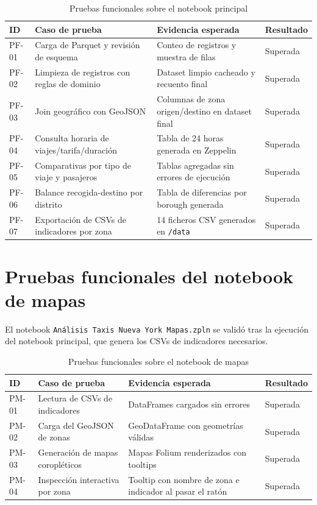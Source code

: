 \begin{table}[H]
	\centering
	\caption{Pruebas funcionales sobre el notebook principal}
	\begin{tabular}{|p{1.7cm}|p{6.1cm}|p{4.1cm}|p{2.4cm}|}
		\hline
		\textbf{ID} & \textbf{Caso de prueba} & \textbf{Evidencia esperada} & \textbf{Resultado} \\
		\hline
		PF-01 & Carga de Parquet y revisión de esquema & Conteo de registros y muestra de filas & Superada \\
		\hline
		PF-02 & Limpieza de registros con reglas de dominio & Dataset limpio cacheado y recuento final & Superada \\
		\hline
		PF-03 & Join geográfico con GeoJSON & Columnas de zona origen/destino en dataset final & Superada \\
		\hline
		PF-04 & Consulta horaria de viajes/tarifa/duración & Tabla de 24 horas generada en Zeppelin & Superada \\
		\hline
		PF-05 & Comparativas por tipo de viaje y pasajeros & Tablas agregadas sin errores de ejecución & Superada \\
		\hline
		PF-06 & Balance recogida-destino por distrito & Tabla de diferencias por borough generada & Superada \\
		\hline
		PF-07 & Exportación de CSVs de indicadores por zona & 14 ficheros CSV generados en \texttt{/data} & Superada \\
		\hline
	\end{tabular}
\end{table}

\section{Pruebas funcionales del notebook de mapas}
El notebook \texttt{Análisis Taxis Nueva York Mapas.zpln} se validó tras la
ejecución del notebook principal, que genera los CSVs de indicadores necesarios.

\begin{table}[H]
	\centering
	\caption{Pruebas funcionales sobre el notebook de mapas}
	\begin{tabular}{|p{1.7cm}|p{6.1cm}|p{4.1cm}|p{2.4cm}|}
		\hline
		\textbf{ID} & \textbf{Caso de prueba} & \textbf{Evidencia esperada} & \textbf{Resultado} \\
		\hline
		PM-01 & Lectura de CSVs de indicadores & DataFrames cargados sin errores & Superada \\
		\hline
		PM-02 & Carga del GeoJSON de zonas & GeoDataFrame con geometrías válidas & Superada \\
		\hline
		PM-03 & Generación de mapas coropléticos & Mapas Folium renderizados con tooltips & Superada \\
		\hline
		PM-04 & Inspección interactiva por zona & Tooltip con nombre de zona e indicador al pasar el ratón & Superada \\
		\hline
	\end{tabular}
\end{table}

